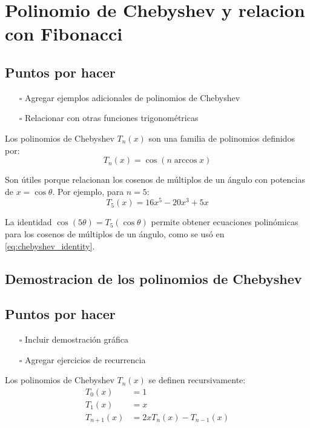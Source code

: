 \section{Polinomio de Chebyshev y relacion con Fibonacci}\label{sec:chebfib}

\subsection{Puntos por hacer}
\begin{itemize}
  \item[$\square$] Agregar ejemplos adicionales de polinomios de Chebyshev
  \item[$\square$] Relacionar con otras funciones trigonométricas
\end{itemize}

Los polinomios de Chebyshev $T_n(x)$ son una familia de polinomios definidos por:
\begin{equation}\label{eq:def_chebyshev}
T_n(x) = \cos(n \arccos x)
\end{equation}

Son útiles porque relacionan los cosenos de múltiplos de un ángulo con potencias de $x = \cos \theta$. Por ejemplo, para $n=5$:
\begin{equation}\label{eq:T5_chebyshev}
T_5(x) = 16x^5 - 20x^3 + 5x
\end{equation}

La identidad $\cos(5\theta) = T_5(\cos \theta)$ permite obtener ecuaciones polinómicas para los cosenos de múltiplos de un ángulo, como se usó en \eqref{eq:chebyshev_identity}.

\subsection{Demostracion de los polinomios de Chebyshev}

\subsection{Puntos por hacer}
\begin{itemize}
  \item[$\square$] Incluir demostración gráfica
  \item[$\square$] Agregar ejercicios de recurrencia
\end{itemize}

Los polinomios de Chebyshev $T_n(x)$ se definen recursivamente:
\begin{align}
T_0(x) &= 1 \label{eq:T0_chebyshev}\\
T_1(x) &= x \label{eq:T1_chebyshev}\\
T_{n+1}(x) &= 2x T_n(x) - T_{n-1}(x) \label{eq:recurrencia_chebyshev}
\end{align}

